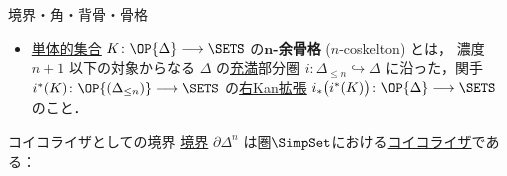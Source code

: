 \documentclass[TQFT_main]{subfiles}
\begin{document}
\begin{mydef}[label=def:horn,breakable]{境界・角・背骨・骨格}
\begin{itemize}
        \item \hyperref[def:SimpSet]{単体的集合} $K \colon \OP{\Delta} \lto \SETS$ の\textbf{$\bm{n}$-余骨格} ($n$-coskelton) とは，
        濃度 $n+1$ 以下の対象からなる $\Delta$ の\hyperref[def:faithful]{充満}部分圏 $i \colon \Delta_{\le n} \hookrightarrow \Delta$ に沿った，関手 $i^*(K) \colon \OP{(\Delta_{\le n})} \lto \SETS$ の\hyperref[def:Kanext]{右Kan拡張} $i_* \bigl(i^* (K)\bigr) \colon \OP{\Delta} \lto \SETS$ のこと．
    \end{itemize}
    
\end{mydef}

\begin{myprop}[label=prop:boundary-coeq]{コイコライザとしての境界}
    \hyperref[def:horn]{境界} $\partial \Delta^n$ は圏\hyperref[def:SimpSet]{$\SimpSet$}における\hyperref[def:eq-coeq]{コイコライザ}である：
    \begin{center}
    \end{center}
\end{myprop}
\end{document}
